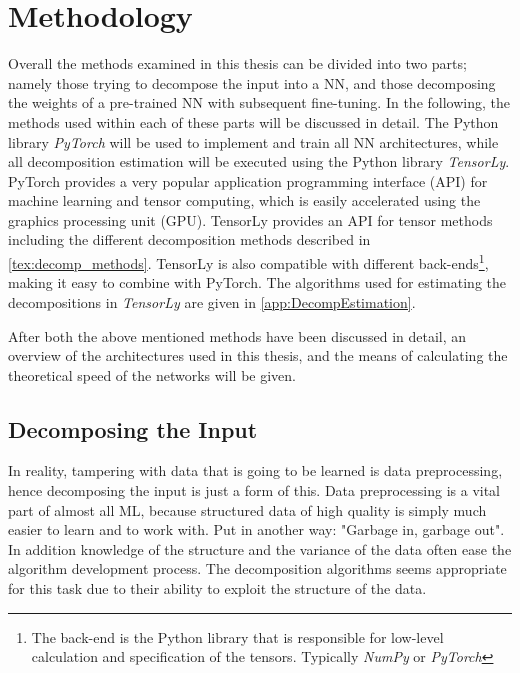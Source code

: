 \section{Methodology} \label{tex:methodology}
Overall the methods examined in this thesis can be divided into two parts; namely those trying to decompose the input into a NN, and those decomposing the weights of a pre-trained NN with subsequent fine-tuning. In the following, the methods used within each of these parts will be discussed in detail. The Python library \textit{PyTorch}\cite{pytorch} will be used to implement and train all NN architectures, while all decomposition estimation will be executed using the Python library \textit{TensorLy}\cite{tensorly}. PyTorch provides a very popular application programming interface (API) for machine learning and tensor computing, which is easily accelerated using the graphics processing unit (GPU). TensorLy provides an API for tensor methods including the different decomposition methods described in \autoref{tex:decomp_methods}. TensorLy is also compatible with different back-ends\footnote{The back-end is the Python library that is responsible for low-level calculation and specification of the tensors. Typically \textit{NumPy}\cite{numpy} or \textit{PyTorch}\cite{pytorch}}, making it easy to combine with PyTorch. The algorithms used for estimating the decompositions in \textit{TensorLy} are given in \autoref{app:DecompEstimation}. 

After both the above mentioned methods have been discussed in detail, an overview of the architectures used in this thesis, and the means of calculating the theoretical speed of the networks will be given.

\subsection{Decomposing the Input}
In reality, tampering with data that is going to be learned is data preprocessing, hence decomposing the input is just a form of this. Data preprocessing is a vital part of almost all ML, because structured data of high quality is simply much easier to learn and to work with. Put in another way: "Garbage in, garbage out". In addition knowledge of the structure and the variance of the data often ease the algorithm development process. The decomposition algorithms seems appropriate for this task due to their ability to exploit the structure of the data.

